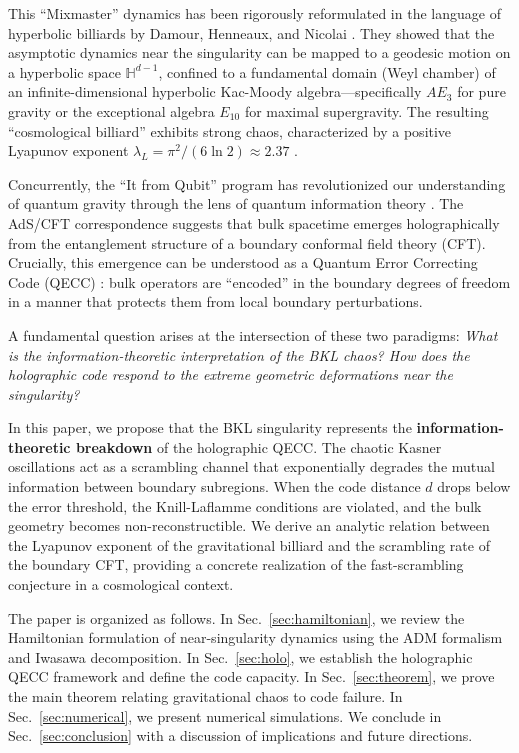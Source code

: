 \documentclass[aps,prd,reprint,nofootinbib,amsmath,amssymb,amsfonts]{revtex4-2}
\begin{document}
This ``Mixmaster'' dynamics \cite{Misner1969} has been rigorously reformulated in the language of hyperbolic billiards by Damour, Henneaux, and Nicolai \cite{Damour_2002,Damour2001}. They showed that the asymptotic dynamics near the singularity can be mapped to a geodesic motion on a hyperbolic space $\mathbb{H}^{d-1}$, confined to a fundamental domain (Weyl chamber) of an infinite-dimensional hyperbolic Kac-Moody algebra---specifically $AE_3$ for pure gravity or the exceptional algebra $E_{10}$ for maximal supergravity. The resulting ``cosmological billiard'' exhibits strong chaos, characterized by a positive Lyapunov exponent $\lambda_L = \pi^2/(6\ln 2) \approx 2.37$ \cite{Chernoff1983}.

Concurrently, the ``It from Qubit'' program has revolutionized our understanding of quantum gravity through the lens of quantum information theory \cite{VanRaamsdonk2010}. The AdS/CFT correspondence \cite{Maldacena1999} suggests that bulk spacetime emerges holographically from the entanglement structure of a boundary conformal field theory (CFT). Crucially, this emergence can be understood as a Quantum Error Correcting Code (QECC) \cite{Almheiri_2015,pastawski2015,Harlow2017}: bulk operators are ``encoded'' in the boundary degrees of freedom in a manner that protects them from local boundary perturbations.

A fundamental question arises at the intersection of these two paradigms: \textit{What is the information-theoretic interpretation of the BKL chaos? How does the holographic code respond to the extreme geometric deformations near the singularity?}

In this paper, we propose that the BKL singularity represents the \textbf{information-theoretic breakdown} of the holographic QECC. The chaotic Kasner oscillations act as a scrambling channel that exponentially degrades the mutual information between boundary subregions. When the code distance $d$ drops below the error threshold, the Knill-Laflamme conditions \cite{KnillLaflamme1997} are violated, and the bulk geometry becomes non-reconstructible. We derive an analytic relation between the Lyapunov exponent of the gravitational billiard and the scrambling rate of the boundary CFT, providing a concrete realization of the fast-scrambling conjecture \cite{Sekino2008,Maldacena2016} in a cosmological context.

The paper is organized as follows. In Sec.~\ref{sec:hamiltonian}, we review the Hamiltonian formulation of near-singularity dynamics using the ADM formalism and Iwasawa decomposition. In Sec.~\ref{sec:holo}, we establish the holographic QECC framework and define the code capacity. In Sec.~\ref{sec:theorem}, we prove the main theorem relating gravitational chaos to code failure. In Sec.~\ref{sec:numerical}, we present numerical simulations. We conclude in Sec.~\ref{sec:conclusion} with a discussion of implications and future directions.
\end{document}
